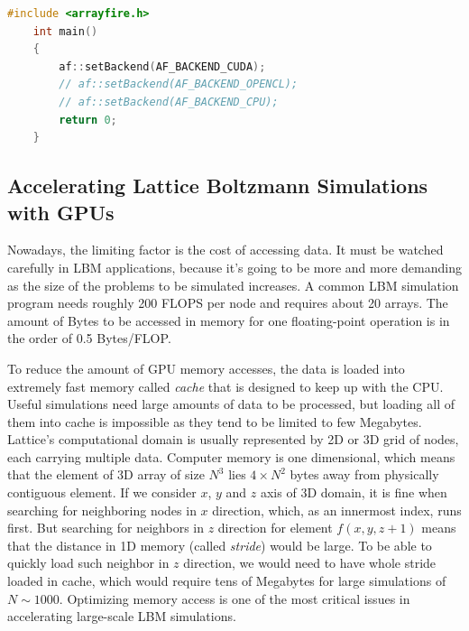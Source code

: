 \begin{lstlisting}[language=Cpp, caption=C++ code for setting different computing backends., label=cpp-backends]
	#include <arrayfire.h>
	int main()
	{
		af::setBackend(AF_BACKEND_CUDA);
		// af::setBackend(AF_BACKEND_OPENCL);
		// af::setBackend(AF_BACKEND_CPU);
		return 0;
	}
\end{lstlisting}

\subsection{Accelerating Lattice Boltzmann Simulations with GPUs}



Nowadays, the limiting factor is the cost of accessing data. It must be watched carefully in LBM applications, because it's going to be more and more demanding as the size of the problems to be simulated increases. A common LBM simulation program needs roughly 200 FLOPS per node and requires about 20 arrays. The amount of Bytes to be accessed in memory for one floating-point operation is in the order of 0.5 Bytes/FLOP. 

To reduce the amount of GPU memory accesses, the data is loaded into extremely fast memory called \emph{cache} that is designed to keep up with the CPU. Useful simulations need large amounts of data to be processed, but loading all of them into cache is impossible as they tend to be limited to few Megabytes. Lattice's computational domain is usually represented by 2D or 3D grid of nodes, each carrying multiple data. Computer memory is one dimensional, which means that the element of 3D array of size $N^3$ lies $4 \times N^2$ bytes away from physically contiguous element. If we consider $x$, $y$ and $z$ axis of 3D domain, it is fine when searching for neighboring nodes in $x$ direction, which, as an innermost index, runs first. But searching for neighbors in $z$ direction for element $f(x,y,z+1)$ means that the distance in 1D memory (called \emph{stride}) would be large. To be able to quickly load such neighbor in $z$ direction, we would need to have whole stride loaded in cache, which would require tens of Megabytes for large simulations of $N \sim 1000$. Optimizing memory access is one of the most critical issues in accelerating large-scale LBM simulations.

